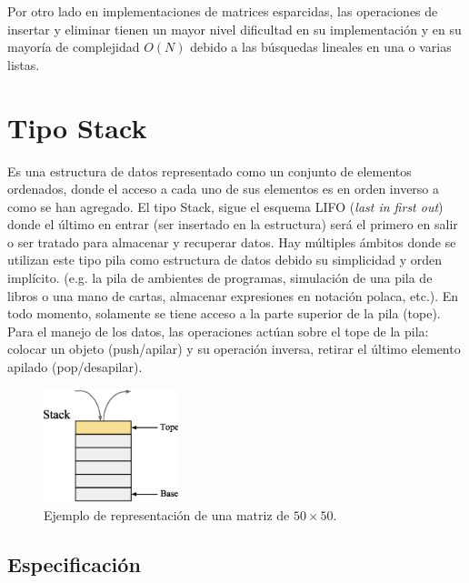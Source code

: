 Por otro lado en implementaciones de matrices esparcidas, las operaciones de insertar y eliminar tienen un mayor nivel dificultad en su implementación y en su mayoría de complejidad $O(N)$ debido a las búsquedas lineales en una o varias listas.

\section{Tipo Stack}

Es una estructura de datos representado como un conjunto de elementos ordenados, donde el acceso a cada uno de sus elementos es en orden inverso a como se han agregado. El tipo Stack, sigue el esquema LIFO (\textit{last in first out}) donde el último en entrar (ser insertado en la estructura) será el primero en salir o ser tratado para almacenar y recuperar datos. Hay múltiples ámbitos donde se utilizan este tipo pila como estructura de datos debido su simplicidad y orden implícito. (e.g. la pila de ambientes de programas, simulación de una pila de libros o una mano de cartas, almacenar expresiones en notación polaca, etc.). En todo momento, solamente se tiene acceso a la parte superior de la pila (tope).  Para el manejo de los datos, las operaciones actúan sobre el tope de la pila: colocar un objeto (push/apilar) y su operación inversa, retirar el último elemento apilado (pop/desapilar).

\begin{figure}[htp!]
  \begin{center}
    \includegraphics[width=0.35\textwidth]{images/stack.eps}
  \end{center}
  \caption{Ejemplo de representación de una matriz de $50 \times 50$.}
  \label{fig:stack1}
\end{figure}

\subsection{Especificación}

